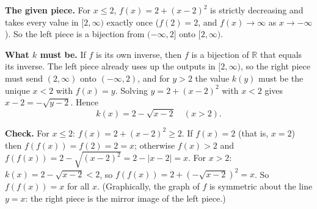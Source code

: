 \textbf{The given piece.} For $x\le2$, $f(x)=2+(x-2)^2$ is strictly decreasing and takes every value in $[2,\infty)$ exactly once ($f(2)=2$, and $f(x)\to\infty$ as $x\to-\infty$). So the left piece is a bijection from $(-\infty,2]$ onto $[2,\infty)$.

\textbf{What $k$ must be.} If $f$ is its own inverse, then $f$ is a bijection of $\mathbb R$ that equals its inverse. The left piece already uses up the outputs in $[2,\infty)$, so the right piece must send $(2,\infty)$ onto $(-\infty,2)$, and for $y>2$ the value $k(y)$ must be the unique $x<2$ with $f(x)=y$. Solving $y=2+(x-2)^2$ with $x<2$ gives $x-2=-\sqrt{y-2}$. Hence
\[
\boxed{k(x)=2-\sqrt{x-2}\quad(x>2)}.
\]

\textbf{Check.} For $x\le2$: $f(x)=2+(x-2)^2\ge2$. If $f(x)=2$ (that is, $x=2$) then $f(f(x))=f(2)=2=x$; otherwise $f(x)>2$ and $f(f(x))=2-\sqrt{(x-2)^2}=2-|x-2|=x$. For $x>2$: $k(x)=2-\sqrt{x-2}<2$, so $f(f(x))=2+\left(-\sqrt{x-2}\right)^2=x$. So $f(f(x))=x$ for all $x$. (Graphically, the graph of $f$ is symmetric about the line $y=x$: the right piece is the mirror image of the left piece.)
